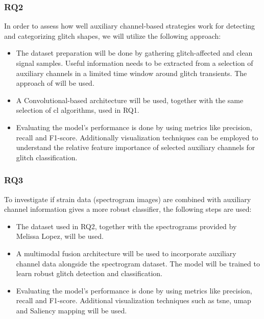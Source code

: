 \subsubsection{RQ2}
In order to assess how well auxiliary channel-based strategies work for detecting and categorizing glitch shapes, we will utilize the following approach:
\begin{itemize}
    \item The dataset preparation will be done by gathering glitch-affected and clean signal samples. Useful information needs to be extracted from a selection of auxiliary channels in a limited time window around glitch transients. The approach of \citep{colgan2020efficient} will be used. 
    \item A Convolutional-based architecture will be used, together with the same selection of \acrshort{cl} algorithms, used in RQ1. 
    \item Evaluating the model's performance is done by using metrics like precision, recall and F1-score. Additionally visualization techniques can be employed to understand the relative feature importance of selected auxiliary channels for glitch classification. 
\end{itemize}
\subsubsection{RQ3}
To investigate if strain data (spectrogram images) are combined with auxiliary channel information gives a more robust classifier, the following steps are used:
\begin{itemize}
    \item The dataset used in RQ2, together with the spectrograms provided by Melissa Lopez, will be used. 
    \item A multimodal fusion architecture will be used to incorporate auxiliary channel data alongside the spectrogram dataset. The model will be trained to learn robust glitch detection and classification. 
    \item Evaluating the model's performance is done by using metrics like precision, recall and F1-score. Additional visualization techniques such as \acrshort{tsne}, \acrshort{umap} and Saliency mapping will be used. 
\end{itemize}